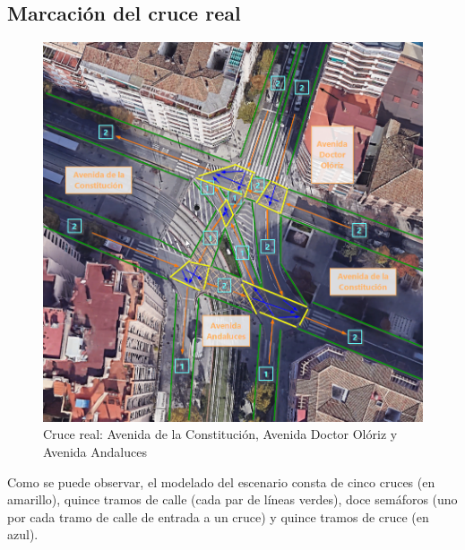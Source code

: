 \subsection{Marcación del cruce real}
\begin{figure}[H]
    \centering
    \includegraphics[width=0.95\linewidth]{text/image/DCruc-CReal.png}
    \caption{Cruce real: Avenida de la Constitución, Avenida Doctor Olóriz y Avenida Andaluces}
    \label{fig:cruce_real}
\end{figure}
Como se puede observar, el modelado del escenario consta de cinco cruces (en amarillo), quince tramos de calle (cada par de líneas verdes), doce semáforos (uno por cada tramo de calle de entrada a un cruce) y quince tramos de cruce (en azul).

\newpage
